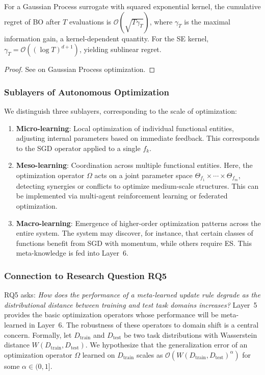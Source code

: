 \begin{theorem}
\label{thm:bo_regret}
For a Gaussian Process surrogate with squared exponential kernel, the cumulative regret of BO after $T$ evaluations is $\mathcal{O}(\sqrt{T \gamma_T})$, where $\gamma_T$ is the maximal information gain, a kernel-dependent quantity. For the SE kernel, $\gamma_T = \mathcal{O}((\log T)^{d+1})$, yielding sublinear regret.
\end{theorem}
\begin{proof}
See \cite{srinivas2010gaussian} on Gaussian Process optimization.
\end{proof}

\subsubsection{Sublayers of Autonomous Optimization}
We distinguish three sublayers, corresponding to the scale of optimization:

\begin{enumerate}
    \item \textbf{Micro-learning}: Local optimization of individual functional entities, adjusting internal parameters based on immediate feedback. This corresponds to the SGD operator applied to a single $f_k$.
    \item \textbf{Meso-learning}: Coordination across multiple functional entities. Here, the optimization operator $\Omega$ acts on a joint parameter space $\Theta_{f_1} \times \cdots \times \Theta_{f_m}$, detecting synergies or conflicts to optimize medium-scale structures. This can be implemented via multi-agent reinforcement learning or federated optimization.
    \item \textbf{Macro-learning}: Emergence of higher-order optimization patterns across the entire system. The system may discover, for instance, that certain classes of functions benefit from SGD with momentum, while others require ES. This meta-knowledge is fed into Layer~6.
\end{enumerate}

\subsubsection{Connection to Research Question RQ5}
RQ5 asks: \emph{How does the performance of a meta-learned update rule degrade as the distributional distance between training and test task domains increases?} Layer~5 provides the basic optimization operators whose performance will be meta-learned in Layer~6. The robustness of these operators to domain shift is a central concern. Formally, let $D_{\text{train}}$ and $D_{\text{test}}$ be two task distributions with Wasserstein distance $W(D_{\text{train}}, D_{\text{test}})$. We hypothesize that the generalization error of an optimization operator $\Omega$ learned on $D_{\text{train}}$ scales as $\mathcal{O}(W(D_{\text{train}}, D_{\text{test}})^\alpha)$ for some $\alpha \in (0,1]$.

